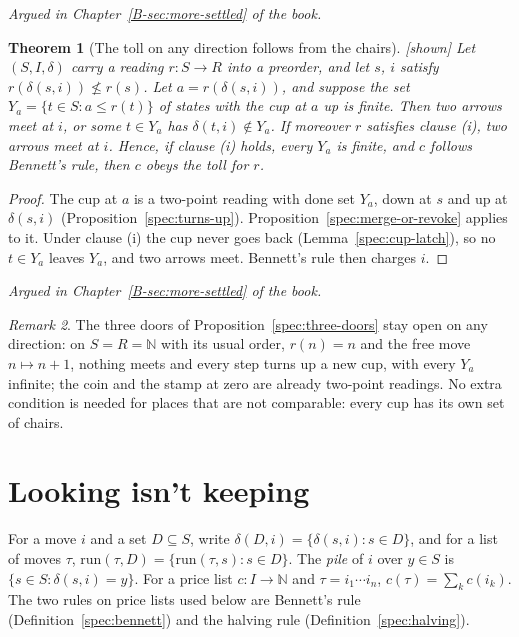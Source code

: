 \documentclass[11pt, a4paper]{article}
\theoremstyle{plain}
\newtheorem{theorem}{Theorem}[section]
\theoremstyle{definition}
\theoremstyle{remark}
\newtheorem{remark}[theorem]{Remark}
\newcommand{\N}{\mathbb{N}}
\newcommand{\step}{\delta}
\newcommand{\cost}{c}
\newcommand{\rd}{r}
\newcommand{\run}{\mathrm{run}}
\newcommand{\argued}[1]{\par\noindent\textit{Argued in Chapter~\ref{B-#1} of the book.}\par}
\newcommand{\kind}[1]{\textup{[#1]}}
\begin{document}
\argued{sec:more-settled}

\begin{theorem}[The toll on any direction follows from the chairs]\label{spec:toll-direction}
\kind{shown}
Let $(S,I,\step)$ carry a reading $\rd:S\to R$ into a preorder, and let $s$, $i$ satisfy
$\rd(\step(s,i))\not\le\rd(s)$. Let $a=\rd(\step(s,i))$, and suppose the set
$Y_a=\{t\in S: a\le\rd(t)\}$ of states with the cup at $a$ up is finite. Then two arrows meet at $i$, or
some $t\in Y_a$ has $\step(t,i)\notin Y_a$. If moreover $\rd$ satisfies clause (i), two arrows meet at
$i$. Hence, if clause (i) holds, every $Y_a$ is finite, and $\cost$ follows Bennett's rule, then $\cost$
obeys the toll for $\rd$.
\end{theorem}

\begin{proof}
The cup at $a$ is a two-point reading with done set $Y_a$, down at $s$ and up at $\step(s,i)$
(Proposition~\ref{spec:turns-up}). Proposition~\ref{spec:merge-or-revoke} applies to it. Under clause (i)
the cup never goes back (Lemma~\ref{spec:cup-latch}), so no $t\in Y_a$ leaves $Y_a$, and two arrows meet.
Bennett's rule then charges $i$.
\end{proof}

\argued{sec:more-settled}

\begin{remark}
The three doors of Proposition~\ref{spec:three-doors} stay open on any direction: on $S=R=\N$ with its
usual order, $\rd(n)=n$ and the free move $n\mapsto n+1$, nothing meets and every step turns up a new cup,
with every $Y_a$ infinite; the coin and the stamp at zero are already two-point readings. No extra
condition is needed for places that are not comparable: every cup has its own set of chairs.
\end{remark}

\section{Looking isn't keeping}\label{spec:ch06}

For a move $i$ and a set $D\subseteq S$, write $\step(D,i)=\{\step(s,i): s\in D\}$, and for a list of moves
$\tau$, $\run(\tau,D)=\{\run(\tau,s): s\in D\}$. The \emph{pile} of $i$ over $y\in S$ is
$\{s\in S:\step(s,i)=y\}$. For a price list $\cost:I\to\N$ and $\tau=i_1\cdots i_n$,
$\cost(\tau)=\sum_{k}\cost(i_k)$. The two rules on price lists used below are Bennett's rule (Definition~\ref{spec:bennett}) and the halving rule (Definition~\ref{spec:halving}).
\end{document}
